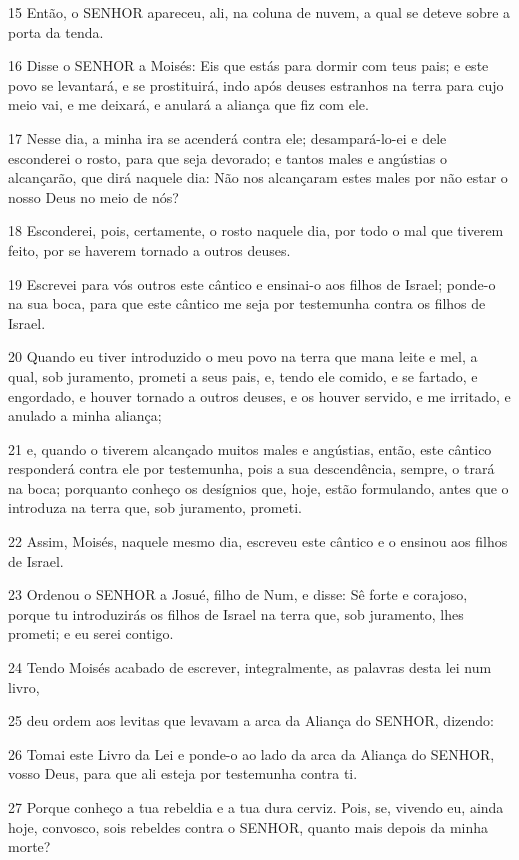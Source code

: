\par 15 Então, o SENHOR apareceu, ali, na coluna de nuvem, a qual se deteve sobre a porta da tenda.
\par 16 Disse o SENHOR a Moisés: Eis que estás para dormir com teus pais; e este povo se levantará, e se prostituirá, indo após deuses estranhos na terra para cujo meio vai, e me deixará, e anulará a aliança que fiz com ele.
\par 17 Nesse dia, a minha ira se acenderá contra ele; desampará-lo-ei e dele esconderei o rosto, para que seja devorado; e tantos males e angústias o alcançarão, que dirá naquele dia: Não nos alcançaram estes males por não estar o nosso Deus no meio de nós?
\par 18 Esconderei, pois, certamente, o rosto naquele dia, por todo o mal que tiverem feito, por se haverem tornado a outros deuses.
\par 19 Escrevei para vós outros este cântico e ensinai-o aos filhos de Israel; ponde-o na sua boca, para que este cântico me seja por testemunha contra os filhos de Israel.
\par 20 Quando eu tiver introduzido o meu povo na terra que mana leite e mel, a qual, sob juramento, prometi a seus pais, e, tendo ele comido, e se fartado, e engordado, e houver tornado a outros deuses, e os houver servido, e me irritado, e anulado a minha aliança;
\par 21 e, quando o tiverem alcançado muitos males e angústias, então, este cântico responderá contra ele por testemunha, pois a sua descendência, sempre, o trará na boca; porquanto conheço os desígnios que, hoje, estão formulando, antes que o introduza na terra que, sob juramento, prometi.
\par 22 Assim, Moisés, naquele mesmo dia, escreveu este cântico e o ensinou aos filhos de Israel.
\par 23 Ordenou o SENHOR a Josué, filho de Num, e disse: Sê forte e corajoso, porque tu introduzirás os filhos de Israel na terra que, sob juramento, lhes prometi; e eu serei contigo.
\par 24 Tendo Moisés acabado de escrever, integralmente, as palavras desta lei num livro,
\par 25 deu ordem aos levitas que levavam a arca da Aliança do SENHOR, dizendo:
\par 26 Tomai este Livro da Lei e ponde-o ao lado da arca da Aliança do SENHOR, vosso Deus, para que ali esteja por testemunha contra ti.
\par 27 Porque conheço a tua rebeldia e a tua dura cerviz. Pois, se, vivendo eu, ainda hoje, convosco, sois rebeldes contra o SENHOR, quanto mais depois da minha morte?
